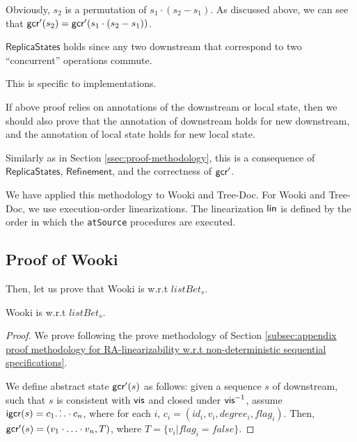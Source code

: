 {\begin{itemize}
    Obviously, $s_2$ is a permutation of $s_1 \cdot (s_2 - s_1)$. As discussed above, we can see that $\mathsf{gcr}'(s_2) = \mathsf{gcr}'(s_1 \cdot (s_2 - s_1))$.
\end{itemize}

 $\mathsf{ReplicaStates}$ holds since any two downstream that correspond to two ``concurrent'' operations commute.

 This is specific to implementations.

 If above proof relies on annotations of the downstream or local state, then we should also prove that the annotation of downstream holds for new downstream, and the annotation of local state holds for new local state.

 Similarly as in Section \ref{ssec:proof-methodology}, this is a consequence of $\mathsf{ReplicaStates}$, $\mathsf{Refinement}$, and the correctness of $\mathsf{gcr}'$.


We have applied this methodology to Wooki and Tree-Doc. For Wooki and Tree-Doc, we use execution-order linearizations. The linearization $\mathsf{lin}$ is defined by the order in which the \lstinline|atSource| procedures are executed.










\subsection{Proof of Wooki}
\label{subsec:proof of Wooki}




Then, let us prove that Wooki is \crdtlinearizable{} w.r.t $\mathit{listBet}_s$.

\begin{lemma}
\label{lemma:Wooki is correct}
Wooki is \crdtlinearizable{} w.r.t $\mathit{listBet}_s$.
\end{lemma}

\begin {proof}

We prove following the prove methodology of Section \ref{subsec:appendix proof methodology for RA-linearizability w.r.t non-deterministic sequential specifications}.

We define abstract state $\mathsf{gcr}'(s)$ as follows: given a sequence $s$ of downstream, such that $s$ is consistent with $\mathsf{vis}$ and closed under $\mathsf{vis}^{-1}$, assume $\mathsf{igcr}(s) = c_1 \dot \ldots \cdot c_n$, where for each $i$, $c_i = (id_i,v_i,degree_i,flag_i)$. Then, $\mathsf{gcr}'(s) = (v_1 \cdot \ldots \cdot v_n,T)$, where $T = \{ v_i \vert flag_i = \mathit{false} \}$.


\end{proof}}
